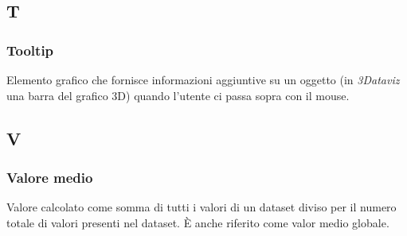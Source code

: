 \subsection{T}
\subsubsection{Tooltip}
Elemento grafico che fornisce informazioni aggiuntive su un oggetto (in
\textit{3Dataviz} una barra del grafico 3D) quando l'utente ci passa sopra con
il mouse.

\subsection{V}
\subsubsection{Valore medio}
Valore calcolato come somma di tutti i valori di un dataset diviso per il
numero totale di valori presenti nel dataset. È anche riferito come valor medio
globale.